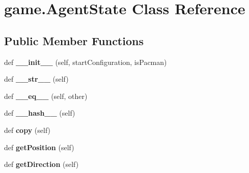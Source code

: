 \hypertarget{classgame_1_1_agent_state}{}\section{game.\+Agent\+State Class Reference}
\label{classgame_1_1_agent_state}
\subsection*{Public Member Functions}
\begin{DoxyCompactItemize}
\item 
\mbox{\label{classgame_1_1_agent_state_ae766a9b7f726d3fefd66a1dd1d1a205b}} 
def {\bfseries \+\_\+\+\_\+init\+\_\+\+\_\+} (self, start\+Configuration, is\+Pacman)
\item 
\mbox{\label{classgame_1_1_agent_state_a57b22b645dc8ea59d753482f941cadf4}} 
def {\bfseries \+\_\+\+\_\+str\+\_\+\+\_\+} (self)
\item 
\mbox{\label{classgame_1_1_agent_state_a0152361046570e4adc1538bc80f5597d}} 
def {\bfseries \+\_\+\+\_\+eq\+\_\+\+\_\+} (self, other)
\item 
\mbox{\label{classgame_1_1_agent_state_aceebe5bf82ab15a2dd41e68a0320b2d1}} 
def {\bfseries \+\_\+\+\_\+hash\+\_\+\+\_\+} (self)
\item 
\mbox{\label{classgame_1_1_agent_state_a63ed2410fe71c9d86e7f1158ac270b16}} 
def {\bfseries copy} (self)
\item 
\mbox{\label{classgame_1_1_agent_state_aa31ead4e3ff2fb8cd28264950567c970}} 
def {\bfseries get\+Position} (self)
\item 
\mbox{\label{classgame_1_1_agent_state_acf377ebf6704a25428a2c96737cb3071}} 
def {\bfseries get\+Direction} (self)
\end{DoxyCompactItemize}
